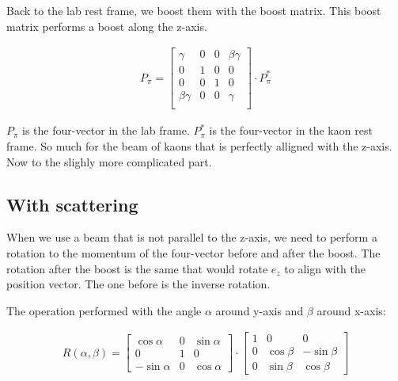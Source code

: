 \documentclass[12pt,a4paper,oneside,english]{article}
\begin{document}
Back to the lab rest frame, we boost them with the boost matrix. This boost matrix performs a boost along the z-axis. 
	
	\begin{align}
		P_{\pi} =
		\begin{bmatrix}
		\gamma & 0 & 0 & \beta \gamma \\
		0 & 1 & 0 & 0 \\
		0 & 0 & 1 & 0\\
		\beta \gamma & 0 & 0 & \gamma \\
		\end{bmatrix}
		\cdot
		P^*_{\pi}
	\end{align}
	
$P_{\pi}$ is the four-vector in the lab frame. $P_{\pi}^*$ is the four-vector in the kaon rest frame. So much for the beam of kaons that is perfectly alligned with the z-axis. Now to the slighly more complicated part.
	
\subsection{With scattering}

When we use a beam that is not parallel to the z-axis, we need to perform a rotation to the momentum of the four-vector before and after the boost. The rotation after the boost is the same that would rotate $e_z$ to align with the position vector. The one before is the inverse rotation.
		
		
The operation performed with the angle $\alpha$ around y-axis and $\beta$ around x-axis:
		
		\begin{align}
				R(\alpha, \beta) = \begin{bmatrix}
				\cos \alpha  & 0 & \sin \alpha \\
				0         & 1 &  0          \\
				-\sin \alpha & 0 & \cos \alpha
				\end{bmatrix} \cdot \begin{bmatrix}
				1 &   0         & 0           \\
				0 & \cos \beta & -\sin \beta \\
				0 & \sin \beta &  \cos \beta
				\end{bmatrix}
		\end{align}
		
\end{document}
